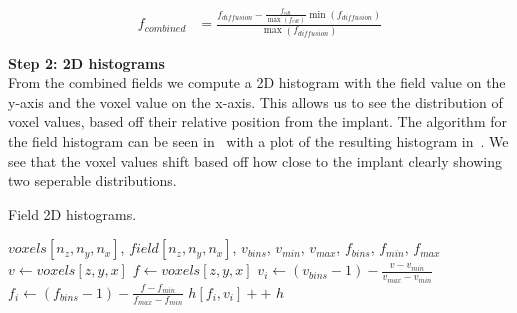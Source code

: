 \begin{equation}
    \label{eq:field-comb}
    \begin{split}
        f_{combined} &= \frac{f_{diffusion} - \frac{f_{edt}}{\max (f_{edt})} \min (f_{diffusion})}{\max (f_{diffusion})}
    \end{split}
\end{equation}

\vspace{\baselineskip}
\noindent\textbf{Step 2: 2D histograms} \\

From the combined fields we compute a 2D histogram with the field value on the y-axis and the voxel value on the x-axis. 
This allows us to see the distribution of voxel values, based off their relative position from the implant.
The algorithm for the field histogram can be seen in~ with a plot of the resulting histogram in~.
We see that the voxel values shift based off how close to the implant clearly showing two seperable distributions.

\begin{algorithm}
    \caption{Field 2D histograms.}
    \label{alg:field-hist}
    \begin{algorithmic}
         {$voxels[n_z,n_y,n_x]$, $field[n_z,n_y,n_x]$, $v_{bins}$, \indent \indent $v_{min}$, $v_{max}$, $f_{bins}$, $f_{min}$, $f_{max}$}
                \State $v \gets voxels[z,y,x]$
                    \State $f \gets voxels[z,y,x]$
                        \State $v_i \gets (v_{bins} - 1) - \frac{v - v_{min}}{v_{max} - v_{min}}$
                        \State $f_i \gets (f_{bins} - 1) - \frac{f - f_{min}}{f_{max} - f_{min}}$
                        \State $h[f_i,v_i]{+}{+}$
                    \EndIf
                \EndIf
            \EndFor
            \Return $h$
        \EndFunction
    \end{algorithmic}
\end{algorithm}

